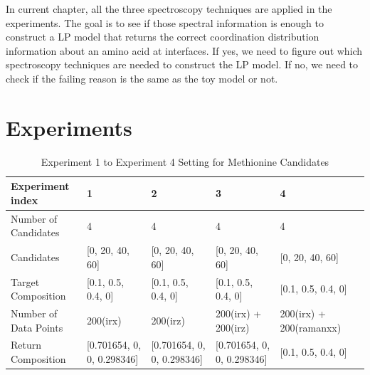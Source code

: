In current chapter, all the three spectroscopy techniques are applied in the experiments. The goal is to see if those spectral information is enough to construct a LP model that returns the correct coordination distribution information about an amino acid at interfaces. If yes, we need to figure out which spectroscopy techniques are needed to construct the LP model. If no, we need to check if the failing reason is the same as the toy model or not. \\

\section{Experiments}

\begin{table}\tiny \label{tab:4.1}
\begin{center}
\begin{tabular}{| l | l | l | l | l | l }
\hline
Experiment index & 1 & 2 & 3 & 4 \\
\hline
Number of Candidates & 4 & 4 & 4 & 4 \\
\hline
Candidates & [0, 20, 40, 60] & [0, 20, 40, 60] & [0, 20, 40, 60] & [0, 20, 40, 60]\\
\hline
Target Composition & [0.1, 0.5, 0.4, 0] & [0.1, 0.5, 0.4, 0] & [0.1, 0.5, 0.4, 0] & [0.1, 0.5, 0.4, 0]\\
\hline
Number of Data Points & 200(irx) & 200(irz) & 200(irx) + 200(irz) & 200(irx) + 200(ramanxx)\\
\hline
Return Composition & [0.701654, 0, 0, 0.298346] & [0.701654, 0, 0, 0.298346] & [0.701654, 0, 0, 0.298346] & [0.1, 0.5, 0.4, 0]\\
\hline
\end{tabular} 
\end{center}
\caption{Experiment 1 to Experiment 4 Setting for Methionine Candidates} 
\end{table}	

